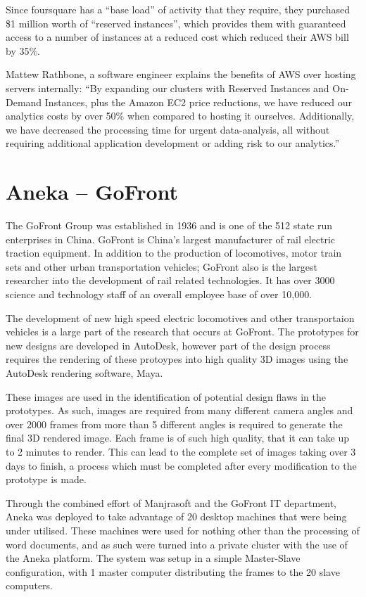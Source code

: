 Since foursquare has a ``base load'' of activity that they require, they purchased \$1 million worth of ``reserved instances'', which provides them with guaranteed access to a number of instances at a reduced cost which reduced their AWS bill by 35\%. 

Mattew Rathbone, a software engineer explains the benefits of AWS over hosting servers internally: ``By expanding our clusters with Reserved Instances and On-Demand Instances, plus the Amazon EC2 price reductions, we have reduced our analytics costs by over 50\% when compared to hosting it ourselves. Additionally, we have decreased the processing time for urgent data-analysis, all without requiring additional application development or adding risk to our analytics.''\ftSAmTwo
\ftSAmTwoText

\section{Aneka -- GoFront}

The GoFront Group was established in 1936 and is one of the 512 state run enterprises in China. 
GoFront is China's largest manufacturer of rail electric traction equipment. In addition to the production of locomotives, motor train sets and other urban transportation vehicles; GoFront also is the largest researcher into the development of rail related technologies. It has over 3000 science and technology staff of an overall employee base of over 10,000\ftSAnOne{}\ftSAnTwo{}\cite{Aneka}.
\ftSAnOneText\ftSAnTwoText 

The development of new high speed electric locomotives and other transportaion vehicles is a large part of the research that occurs at GoFront. The prototypes for new designs are developed in AutoDesk, however part of the design process requires the rendering of these protoypes into high quality 3D images using the AutoDesk rendering software, Maya. 

These images are used in the identification of potential design flaws in the prototypes. As such, images are required from many different camera angles and over 2000 frames from more than 5 different angles is required to generate the final 3D rendered image. Each frame is of such high quality, that it can take up to 2 minutes to render. This can lead to the complete set of images taking over 3 days to finish, a process which must be completed after every modification to the prototype is made. 

Through the combined effort of Manjrasoft and the GoFront IT department, Aneka was deployed to take advantage of 20 desktop machines that were being under utilised. These machines were used for nothing other than the processing of word documents, and as such were turned into a private cluster with the use of the Aneka platform. The system was setup in a simple Master-Slave configuration, with 1 master computer distributing the frames to the 20 slave computers.

